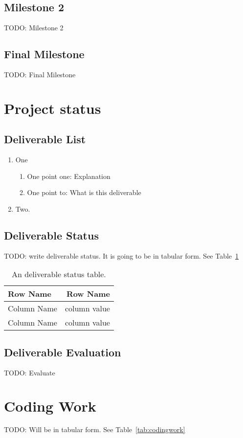 \documentclass[a4paper]{article}
\begin{document}
\subsection{Milestone 2}
TODO: Milestone 2
\subsection{Final Milestone}
TODO: Final Milestone

\section{Project status}
\subsection{Deliverable List}

\begin{enumerate}
\item One
  \begin{enumerate}
  \item One point one: Explanation
  \item One point to: What is this deliverable
  \end{enumerate}
\item Two.
\end{enumerate}

\subsection{Deliverable Status}
TODO: write deliverable status. It is going to be in tabular form. See Table~\ref{tab:deliverablestatus}

\begin{table}
\centering
\begin{tabular}{l|r}
Row Name & Row Name \\\hline
Column Name & column value \\
Column Name & column value
\end{tabular}
\caption{\label{tab:deliverablestatus}An deliverable status table.}
\end{table}

\subsection{Deliverable Evaluation}
TODO: Evaluate

\section{Coding Work}
TODO: Will be in tabular form. See Table~\ref{tab:codingwork}
\end{document}
